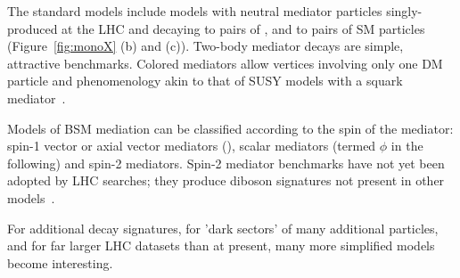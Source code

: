 
The standard models include models with neutral mediator particles singly-produced at the LHC and decaying to pairs of \IP, and to pairs of SM particles (Figure~\ref{fig:monoX} (b) and (c)). Two-body mediator decays are simple, attractive benchmarks. Colored mediators allow vertices involving only one DM particle and phenomenology akin to that of SUSY models with a squark mediator~\cite{Papucci:2014iwa,An:2013xka,Bell:2012rg}. 

Models of BSM mediation can be classified according to the spin of the mediator: spin-1 vector or axial vector mediators (\Zprime), scalar mediators (termed $\phi$ in the following) and spin-2 mediators. Spin-2 mediator benchmarks have not yet been adopted by LHC searches; they produce diboson signatures not present in other models~\cite{Han:2015cty}. %

For additional decay signatures, for 'dark sectors' of many additional particles, and for far larger LHC datasets than at present, many more simplified models become interesting. 



